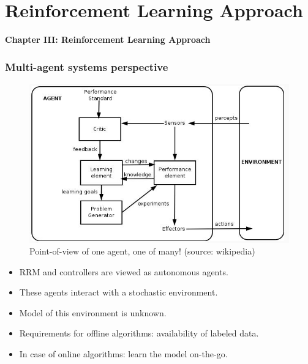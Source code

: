 \documentclass{beamer}
\begin{document}
\section{Reinforcement Learning Approach}
\begin{frame}
\centerline{\textbf{Chapter III: Reinforcement Learning Approach}}

\end{frame}
\begin{frame}
 \frametitle{Multi-agent systems perspective}
 \begin{figure}
\centering
\includegraphics[height= .3 \textheight, width=.6\textwidth]{ncs2}
\caption{{\footnotesize Point-of-view of one agent, one of many! (source: wikipedia)}} 
\label{fig2}
\end{figure}
\vspace*{-.3in}
\begin{itemize}
 \item RRM and controllers are viewed as autonomous agents.
 \item These agents interact with a stochastic environment.
 \item Model of this environment is {\color{blue} unknown}.
 \item Requirements for offline algorithms: {\color{blue}availability of labeled data}. 
 \item In case of online algorithms: {\color{blue} learn the model on-the-go}.
\end{itemize}
\end{frame}
\end{document}
